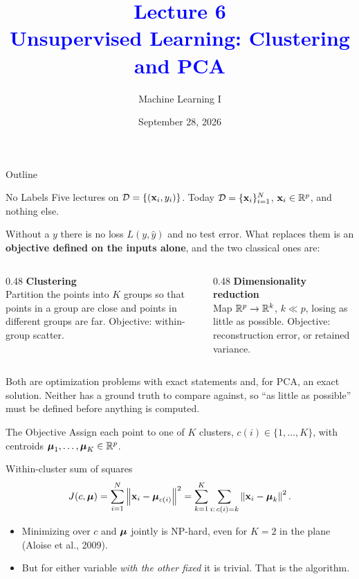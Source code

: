 \documentclass[11pt,aspectratio=169]{beamer}
\title{\textcolor{blue}{Lecture 6 \\ Unsupervised Learning: Clustering and PCA}}
\subtitle{Machine Learning I}
\date{September 28, 2026}
\begin{document}
\begin{frame}[plain]
\maketitle
\end{frame}

\begin{frame}{Outline}
\tableofcontents
\end{frame}

\begin{frame}{No Labels}
Five lectures on $\mathcal{D}=\{(\mathbf{x}_i,y_i)\}$. Today $\mathcal{D}=\{\mathbf{x}_i\}_{i=1}^N$, $\mathbf{x}_i\in\mathbb{R}^p$, and nothing else.
\vspace{4pt}

Without a $y$ there is no loss $L(y,\hat y)$ and no test error. What replaces them is an \textbf{objective
defined on the inputs alone}, and the two classical ones are:
\begin{columns}[T]
\begin{column}{0.48\textwidth}
\textbf{Clustering}\\
Partition the points into $K$ groups so that points in a group are close and points in different groups are far.
Objective: within-group scatter.
\end{column}
\begin{column}{0.48\textwidth}
\textbf{Dimensionality reduction}\\
Map $\mathbb{R}^p\to\mathbb{R}^k$, $k\ll p$, losing as little as possible. Objective: reconstruction error, or retained variance.
\end{column}
\end{columns}
\vspace{8pt}
\begin{keypoint}
Both are optimization problems with exact statements and, for PCA, an exact solution. Neither has a
ground truth to compare against, so ``as little as possible'' must be defined before anything is computed.
\end{keypoint}
\end{frame}


\begin{frame}{The Objective}
Assign each point to one of $K$ clusters, $c(i)\in\{1,\dots,K\}$, with centroids $\boldsymbol{\mu}_1,\dots,\boldsymbol{\mu}_K\in\mathbb{R}^p$.
\begin{block}{Within-cluster sum of squares}
\[
J(c,\boldsymbol{\mu})=\sum_{i=1}^N\left\lVert \mathbf{x}_i-\boldsymbol{\mu}_{c(i)} \right\rVert^2=\sum_{k=1}^K\sum_{i:\,c(i)=k}\left\lVert \mathbf{x}_i-\boldsymbol{\mu}_k \right\rVert^2 .
\]
\end{block}
\begin{itemize}
  \item Minimizing over $c$ and $\boldsymbol{\mu}$ jointly is NP-hard, even for $K=2$ in the plane (Aloise et al., 2009).
  \item But for either variable \emph{with the other fixed} it is trivial. That is the algorithm.
\end{itemize}
\end{frame}
\end{document}
